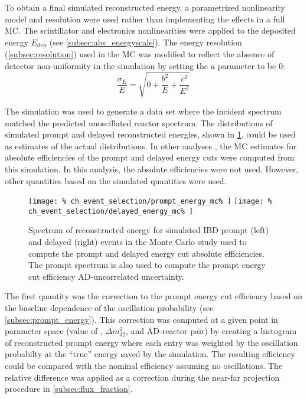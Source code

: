 To obtain a final simulated reconstructed energy,
a parametrized nonlinearity model and resolution were used
rather than implementing the effects in a full MC.
The scintillator and electronics nonlinearities were applied
to the deposited energy $E_{\text{dep}}$
(see \cref{subsec:abs_energyscale}).
The energy resolution (\cref{subsec:resolution}) used in the MC
was modified to reflect
the absence of detector non-uniformity in the simulation
by setting the $a$ parameter to be 0:
\begin{equation}
    \frac{\sigma_E}{E} = \sqrt{0 + \frac{b^2}{E} + \frac{c^2}{E^2}}
\end{equation}

The simulation was used to generate a data set
where the incident \nuebar{} spectrum
matched the predicted unoscillated reactor \nuebar{} spectrum.
The distributions of simulated prompt and delayed reconstructed energies,
shown in \cref{fig:prompt_eff_mc},
could be used as estimates of the actual distributions.
In other analyses \cite{nh2016}, the MC estimates
for absolute efficiencies of the prompt and delayed energy cuts
were computed from this simulation.
In this analysis, the absolute efficiencies were not used.
However, other quantities based on the simulated quantities
were used.

\begin{figure}
    \centering
    \texttt{[image: \%
        ch\_event\_selection/prompt\_energy\_mc\%
    ]}
    \texttt{[image: \%
        ch\_event\_selection/delayed\_energy\_mc\%
    ]}
    \caption[Simulated prompt and delayed spectra]{Spectrum of reconstructed energy for simulated IBD prompt (left)
        and delayed (right) events
        in the Monte Carlo study used to compute the prompt and delayed
        energy cut absolute efficiencies.
        The prompt spectrum is also used to compute the prompt energy cut
    efficiency AD-uncorrelated uncertainty.}
    \label{fig:prompt_eff_mc}
\end{figure}

The first quantity was the correction to the prompt energy cut efficiency
based on the baseline dependence of the oscillation probability
(see \cref{subsec:prompt_energy}).
This correction was computed at a given point in parameter space
(value of \thetaot{}, $\Delta m^2_{32}$, and AD-reactor pair)
by creating a histogram of reconstructed prompt energy
where each entry was weighted by the oscillation probabilty
at the ``true'' \nuebar{} energy saved by the simulation.
The resulting efficiency could be compared
with the nominal efficiency assuming no oscillations.
The relative difference was applied as a correction
during the near-far projection procedure in \cref{subsec:flux_fraction}.

